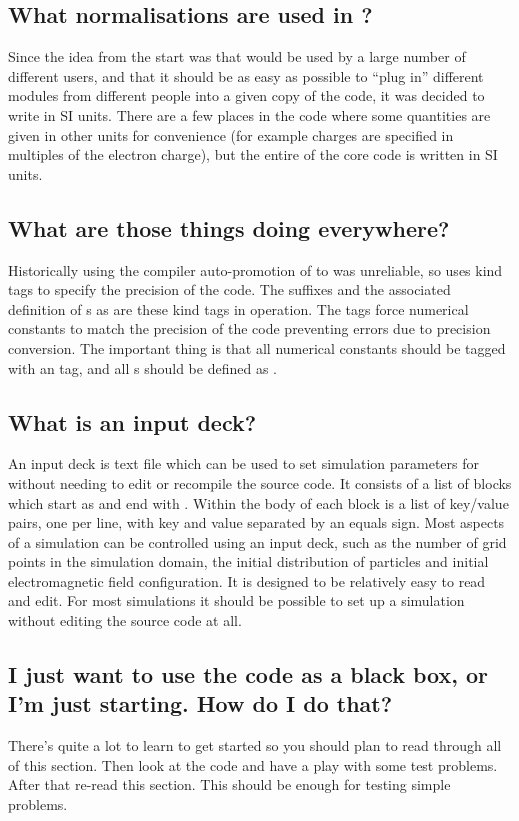 \subsection{What normalisations are used in {\EPOCH}?}
Since the idea from the start was that {\EPOCH} would be used by a large number
of different users, and that it should be as easy as possible to ``plug in''
different modules from different people into a given copy of the code, it was
decided to write {\EPOCH} in SI units. There are a few places in the code where
some quantities are given in other units for convenience (for example charges
are specified in multiples of the electron charge), but the entire of the core
code is written in SI units.

\subsection{What are those  things doing everywhere?}
Historically using the compiler auto-promotion of  to
 was unreliable, so {\EPOCH} uses kind tags to specify
the precision of the code. The  suffixes and the associated
definition of s as  are these kind tags in
operation. The  tags force numerical constants to match the
precision of the code preventing errors due to precision conversion. The
important thing is that all numerical constants should be tagged with an
 tag, and all s should be defined as .

\subsection{What is an input deck?}
An input deck is text file which can be used to set simulation parameters
for {\EPOCH} without needing to edit or recompile the source code.
It consists of a list of blocks which start as 
and end with . Within the body of each block is
a list of key/value pairs, one per line, with key and value separated by
an equals sign. Most aspects of a simulation can be controlled using an
input deck, such as the number of grid points in the simulation domain,
the initial distribution of particles and initial electromagnetic field
configuration. It is designed to be relatively easy to read and edit. For
most simulations it should be possible to set up a simulation without
editing the source code at all.

\subsection{I just want to use the code as a black box, or I'm just
  starting. How do I do that?}
 There's quite a lot to learn to get started so you
should plan to read through all of this section. Then look at the code and have
a play with some test problems. After that re-read this section. This should be
enough for testing simple problems.

